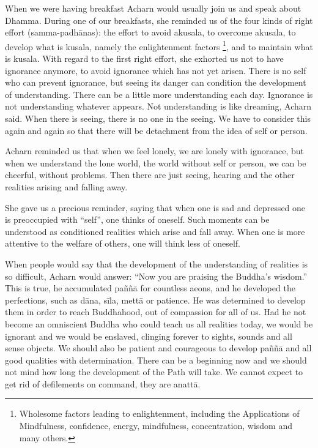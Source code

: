 When we were having breakfast Acharn would usually join us and speak
about Dhamma. During one of our breakfasts, she reminded us of the four
kinds of right effort (samma-padhānas): the effort to avoid akusala, to
overcome akusala, to develop what is kusala, namely the enlightenment
factors
\footnote{Wholesome factors leading to
enlightenment, including the Applications of Mindfulness, confidence,
energy, mindfulness, concentration, wisdom and many others.},
and to maintain what is kusala. With regard to the first right effort,
she exhorted us not to have ignorance anymore, to avoid ignorance which
has not yet arisen. There is no self who can prevent ignorance, but
seeing its danger can condition the development of understanding. There
can be a little more understanding each day. Ignorance is not
understanding whatever appears. Not understanding is like dreaming,
Acharn said. When there is seeing, there is no one in the seeing. We
have to consider this again and again so that there will be detachment
from the idea of self or person.

Acharn reminded us that when we feel lonely, we are lonely with
ignorance, but when we understand the lone world, the world without self
or person, we can be cheerful, without problems. Then there are just
seeing, hearing and the other realities arising and falling away.

She gave us a precious reminder, saying that when one is sad and
depressed one is preoccupied with ``self'', one thinks of oneself. Such
moments can be understood as conditioned realities which arise and fall
away. When one is more attentive to the welfare of others, one will
think less of oneself.

When people would say that the development of the understanding of
realities is so difficult, Acharn would answer: ``Now you are praising
the Buddha's wisdom.'' This is true, he accumulated paññā for countless
aeons, and he developed the perfections, such as dāna, sīla, mettā or
patience. He was determined to develop them in order to reach
Buddhahood, out of compassion for all of us. Had he not become an
omniscient Buddha who could teach us all realities today, we would be
ignorant and we would be enslaved, clinging forever to sights, sounds
and all sense objects. We should also be patient and courageous to
develop paññā and all good qualities with determination. There can be a
beginning now and we should not mind how long the development of the
Path will take. We cannot expect to get rid of defilements on command,
they are anattā.

